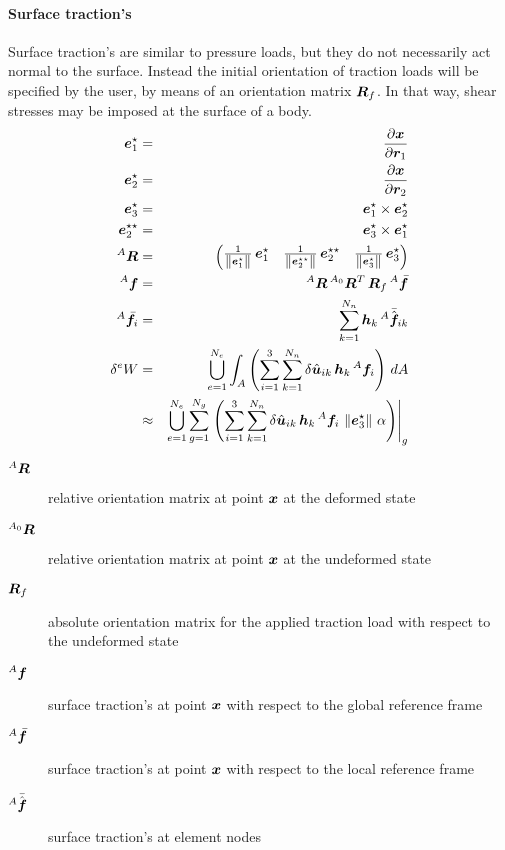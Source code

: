 \paragraph{Surface traction's}
Surface traction's are similar to pressure loads, but they do not necessarily act normal to the surface.
Instead the initial orientation of traction loads will be specified by the user, by means of an orientation matrix $\bm{R}_f$.
In that way, shear stresses may be imposed at the surface of a body.
\begin{eqnarray}
\bm{e}_1^{\star} & = & \frac{\partial \bm{x}}{\partial \bm{r}_1} \\
\bm{e}_2^{\star} & = & \frac{\partial \bm{x}}{\partial \bm{r}_2} \\
\bm{e}_3^{\star} & = & \bm{e}_1^{\star} \times \bm{e}_2^{\star} \\
\bm{e}_2^{\star\star} & = & \bm{e}_3^{\star} \times \bm{e}_1^{\star} \\
{^A}\bm{R} & = & \begin{pmatrix}
\frac{1}{\left\Vert\bm{e}_1^{\star}\right\Vert} \, \bm{e}_1^{\star} & \frac{1}{\left\Vert\bm{e}_2^{\star\star}\right\Vert} \, \bm{e}_2^{\star\star} & \frac{1}{\left\Vert\bm{e}_3^{\star}\right\Vert} \, \bm{e}_3^{\star}
\end{pmatrix} \\
{^A}\bm{f} & = & {^A}\bm{R} \, {^{A_0}}\bm{R}^T \, \bm{R}_f \, {^A}\bar{\bm{f}} \\
{^A}\bar{\bm{f}}_i & = & \sum_{k=1}^{N_n} \bm{h}_{k} \, {^A}\bar{\hat{\bm{f}}}_{ik} \\
\delta{^e}W & = & \bigcup_{e=1}^{N_e}\int_{A} \left(\sum_{i=1}^3 \sum_{k=1}^{N_n} \delta\hat{\bm{u}}_{ik} \, \bm{h}_{k} \, {^A}\bm{f}_i \right) \, dA \\
 & \approx & \bigcup_{e=1}^{N_e}\sum_{g=1}^{N_g} \left.\left(\sum_{i=1}^3 \sum_{k=1}^{N_n} \delta\hat{\bm{u}}_{ik} \, \bm{h}_{k} \, {^A}\bm{f}_i \, \left\Vert \bm{e}_3^{\star} \right\Vert \, \alpha \right)\right\vert_{g}
\end{eqnarray}
\begin{description}
\item[${^A}\bm{R}$] relative orientation matrix at point $\bm{x}$ at the deformed state
\item[${^{A_0}}\bm{R}$] relative orientation matrix at point $\bm{x}$ at the undeformed state
\item[$\bm{R}_f$] absolute orientation matrix for the applied traction load with respect to the undeformed state
\item[${^A}\bm{f}$] surface traction's at point $\bm{x}$ with respect to the global reference frame
\item[${^A}\bar{\bm{f}}$] surface traction's at point $\bm{x}$ with respect to the local reference frame
\item[${^A}\bar{\hat{\bm{f}}}$] surface traction's at element nodes
\end{description}

